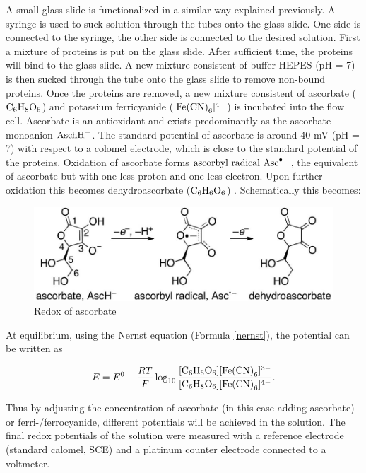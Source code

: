 \documentclass[twoside,single]{lion-msc}
\begin{document}
A small glass slide is functionalized in a similar way explained previously. A syringe is used to suck solution through the tubes onto the glass slide. One side is connected to the syringe, the other side is connected to the desired solution. First a mixture of proteins is put on the glass slide. After sufficient time, the proteins will bind to the glass slide. A new mixture consistent of buffer HEPES (pH = 7) is then sucked through the tube onto the glass slide to remove non-bound proteins. Once the proteins are removed, a new mixture consistent of ascorbate ($\textup{C}_{6}\textup{H}_{8}\textup{O}_{6}$) and potassium ferricyanide ($[\textup{Fe(CN)}_{6}]^{4-}$) is incubated into the flow cell. Ascorbate is an antioxidant and exists predominantly as the ascorbate monoanion  $\textup{AschH}^{-}$. The standard potential of ascorbate is around 40 mV (pH = 7) with respect to a colomel electrode, which is close to the standard potential of the proteins. Oxidation of ascorbate forms $\textup{ascorbyl radical Asc}^{\bullet  -}$, the equivalent of ascorbate but with one less proton and one less electron. Upon further oxidation this becomes dehydroascorbate ($\textup{C}_{6}\textup{H}_{6}\textup{O}_{6}$) \cite{Warren2010}. Schematically this becomes:

\begin{figure}[ht!]
\centering
\includegraphics[width=\textwidth]{redox_asc}
\caption{Redox of ascorbate}
\label{redox_asc}
\end{figure}

At equilibrium, using the Nernst equation (Formula \ref{nernst}), the potential can be written as

\begin{equation}
E = E^{0} - \frac{RT}{F} \log_{10} \frac{[\textup{C}_{6}\textup{H}_{6}\textup{O}_{6}][\textup{Fe(CN)}_{6}]^{3-}}{[\textup{C}_{6}\textup{H}_{8}\textup{O}_{6}][\textup{Fe(CN)}_{6}]^{4-}}.
\end{equation}

Thus by adjusting the concentration of ascorbate (in this case adding ascorbate) or ferri-/ferrocyanide, different potentials will be achieved in the solution. The final redox potentials of the solution were measured with a reference electrode (standard calomel, SCE) and a platinum counter electrode connected to a voltmeter.
\end{document}
